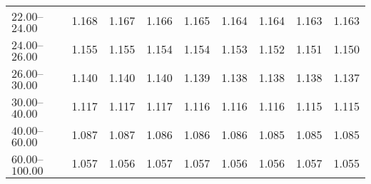 \begin{table}[htp]
\begin{tiny}
\begin{center}
\begin{tabular}{|l|c|c|c|c|c|c|c|c|}
$22.00$--$24.00$ & 1.168 & 1.167 & 1.166 & 1.165 & 1.164 & 1.164 & 1.163 & 1.163  \\
$24.00$--$26.00$ & 1.155 & 1.155 & 1.154 & 1.154 & 1.153 & 1.152 & 1.151 & 1.150  \\
$26.00$--$30.00$ & 1.140 & 1.140 & 1.140 & 1.139 & 1.138 & 1.138 & 1.138 & 1.137  \\
$30.00$--$40.00$ & 1.117 & 1.117 & 1.117 & 1.116 & 1.116 & 1.116 & 1.115 & 1.115  \\
$40.00$--$60.00$ & 1.087 & 1.087 & 1.086 & 1.086 & 1.086 & 1.085 & 1.085 & 1.085  \\
$60.00$--$100.00$ & 1.057 & 1.056 & 1.057 & 1.057 & 1.056 & 1.056 & 1.057 & 1.055  \\
\hline
\end{tabular} 
             \end{center} 
             \end{tiny} 
             \label{tab:sa_trp0_jpsi} 
             \end{table}


